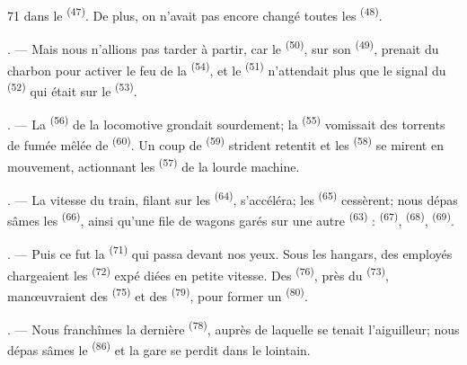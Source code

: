 \begin{VUpage}[73]{71}
\VUcontinue
dans le  \textsuperscript{(47)}. De plus, on\nl
n'avait pas encore changé toutes les  \textsuperscript{(48)}.

. --- Mais nous n'allions pas tarder à partir, car le\nl
{}\textsuperscript{(50)}, sur son \textsuperscript{(49)}, prenait du charbon\nl
pour activer le feu de la  \textsuperscript{(54)}, et le \cc
{} \textsuperscript{(51)} n'attendait plus que le signal du \cc
{} \textsuperscript{(52)} qui était sur le  \textsuperscript{(53)}.

. --- La \textsuperscript{(56)} de la locomotive grondait\nl
sourdement; la  \textsuperscript{(55)} vomissait des torrents\nl
de fumée mêlée de \textsuperscript{(60)}. Un coup de \textsuperscript{(59)}\nl
strident retentit et les \textsuperscript{(58)} se mirent en\nl
mouvement, actionnant les \textsuperscript{(57)} de la lourde\nl
machine.

. --- La vitesse du train, filant sur les \textsuperscript{(64)},\nl
s'accéléra; les \textsuperscript{(65)} cessèrent; nous dépas\cc
sâmes les \textsuperscript{(66)}, ainsi qu'une file\nl
de wagons garés sur une autre \textsuperscript{(63)} : \cc
{}\textsuperscript{(67)}, \textsuperscript{(68)}, \textsuperscript{(69)}.

. --- Puis ce fut la \textsuperscript{(71)}\nl
qui passa devant nos yeux. Sous les hangars, des\nl
employés chargeaient les \textsuperscript{(72)} expé\cc
diées en petite vitesse. Des \textsuperscript{(76)},\nl
près du \textsuperscript{(73)}, manœuvraient des\nl
{}\textsuperscript{(75)} et des \cc
{}\textsuperscript{(79)}, pour former un \cc
{}\textsuperscript{(80)}.

. --- Nous franchîmes la dernière \textsuperscript{(78)},\nl
auprès de laquelle se tenait l'aiguilleur; nous dépas\cc
sâmes le \textsuperscript{(86)} et la gare se perdit dans le\nl
lointain.


\end{VUpage}
